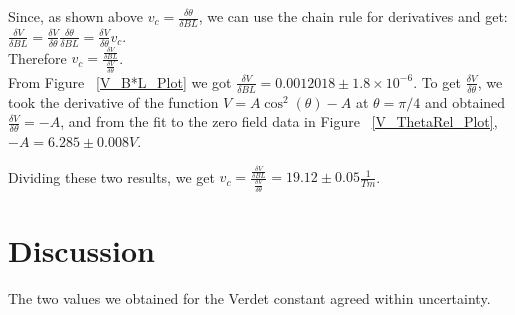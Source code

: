 \documentclass[prb,preprint]{revtex4-1}
\begin{document}
Since, as shown above $v_c = \frac{\delta \theta}{\delta BL}$, we can use the chain rule for derivatives and get: 
\\
$\frac{\delta V}{\delta BL} = \frac{\delta V}{\delta \theta} \frac{\delta \theta}{\delta BL} = \frac{\delta V}{\delta \theta} v_c$.  
\\
Therefore $v_c = \frac{\frac{\delta V}{\delta BL}}{\frac{\delta V}{\delta \theta}}$.
\\
From Figure ~\ref{V_B*L_Plot} we got $\frac{\delta V}{\delta BL} = 0.0012018 \pm 1.8 \times 10^{-6}$. To get $\frac{\delta V}{\delta \theta}$, we took the derivative of the function $V = A \cos^{2}(\theta) - A$ at $\theta = \pi/4$ and obtained $\frac{\delta V}{\delta \theta} = -A$, and from the fit to the zero field data in Figure ~\ref{V_ThetaRel_Plot}, $-A = 6.285 \pm 0.008 V$.  

Dividing these two results, we get $v_c = \frac{\frac{\delta V}{\delta BL}}{\frac{\delta V}{\delta \theta}} = 19.12 \pm 0.05 \frac{1}{Tm}$.  





\section{Discussion}

The two values we obtained for the Verdet constant agreed within uncertainty. 
\end{document}

